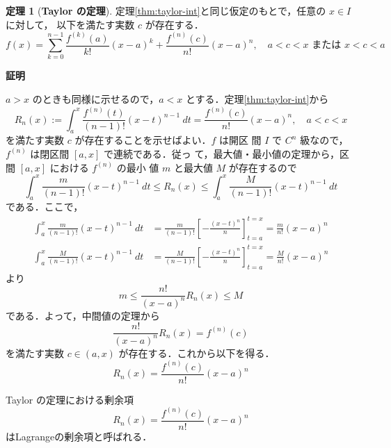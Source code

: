 \documentclass[10pt, uplatex, dvipdfmx]{jsarticle}
\makeatletter
\renewenvironment{proof}[1][\proofname]{\par
  \pushQED{\qed}%
  \normalfont \topsep6\p@\@plus6\p@\relax
  \trivlist
  \item\relax
  {\bfseries
  #1\@addpunct{.}}\hspace\labelsep\ignorespaces
}{%
  \popQED\endtrivlist\@endpefalse
}
\theoremstyle{definition}
\newtheorem{theorem}{定理}[section]
\renewcommand{\proofname}{\textbf{証明}}
\numberwithin{equation}{section}
\makeatother
\begin{document}
\begin{theorem}[\textbf{Taylor の定理}]\label{thm:taylor}
  定理\ref{thm:taylor-int}と同じ仮定のもとで，任意の $x \in I$ に対して，
  以下を満たす実数 $c$ が存在する．
  \[
    f(x) = \sum_{k=0}^{n-1}\frac{f^{(k)}(a)}{k!}(x-a)^k
    +\frac{f^{(n)}(c)}{n!}(x-a)^n, \quad a<c<x \text{ または } x<c<a
  \]
\end{theorem}

\begin{proof}
  $a>x$ のときも同様に示せるので，$a<x$ とする．定理\ref{thm:taylor-int}から
  \[
    R_n(x):=\int_{a}^{x}\frac{f^{(n)}(t)}{(n-1)!}(x-t)^{n-1}\ dt =
    \frac{f^{(n)}(c)}{n!}(x-a)^n, \quad a<c<x
  \]
  を満たす実数 $c$ が存在することを示せばよい．$f$ は開区
  間 $I$ で $C^n$ 級なので，$f^{(n)}$ は閉区間 $[a,x]$ で連続である．従っ
  て，最大値・最小値の定理から，区間 $[a,x]$ における $f^{(n)}$ の最小
  値 $m$ と最大値 $M$ が存在するので
  \[
    \int_{a}^{x} \frac{m}{(n-1)!}(x-t)^{n-1}\ dt
    \leq R_n(x)
    \leq \int_{a}^{x} \frac{M}{(n-1)!}(x-t)^{n-1}\ dt
  \]
  である．ここで，
  \[
    \begin{aligned}
      \int_{a}^{x}\frac{m}{(n-1)!}(x-t)^{n-1}\ dt
      &= \frac{m}{(n-1)!}\left[ -\frac{(x-t)^{n}}{n}\right]_{t=a}^{t=x}
      =\frac{m}{n!}(x-a)^n\\ 
      \int_{a}^{x}\frac{M}{(n-1)!}(x-t)^{n-1}\ dt
      &=\frac{M}{(n-1)!}\left[ -\frac{(x-t)^{n}}{n}\right]_{t=a}^{t=x}=\frac{M}{n!}(x-a)^n
    \end{aligned}
  \]
  より
  \[
    m \leq \frac{n!}{(x-a)^n} R_n(x) \leq M
  \]
  である．よって，中間値の定理から
  \[
    \frac{n!}{(x-a)^n}R_n(x) =f^{(n)}(c)
  \]
  を満たす実数 $c \in (a,x)$ が存在する．これから以下を得る．
  \[
    R_n(x) = \frac{f^{(n)}(c)}{n!}(x-a)^n
  \]
\end{proof}

Taylor の定理における剰余項
\[
  R_n(x) = \frac{f^{(n)}(c)}{n!}(x-a)^n
\]
はLagrangeの剰余項と呼ばれる．
\end{document}
